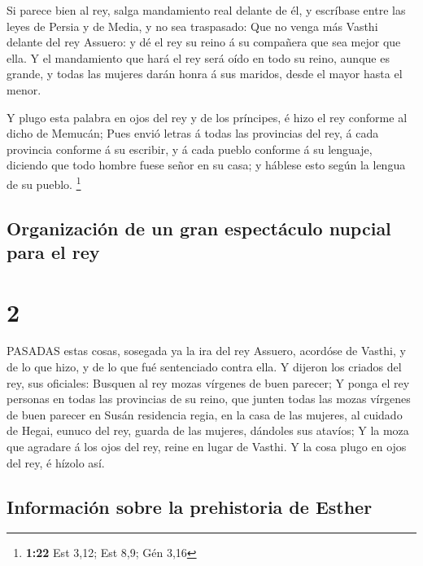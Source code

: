  Si parece bien al rey, salga mandamiento real delante de
él, y escríbase entre las leyes de Persia y de Media, y no sea
traspasado: Que no venga más Vasthi delante del rey Assuero: y dé el rey
su reino á su compañera que sea mejor que ella.  Y el
mandamiento que hará el rey será oído en todo su reino, aunque es
grande, y todas las mujeres darán honra á sus maridos, desde el mayor
hasta el menor.

 Y plugo esta palabra en ojos del rey y de los príncipes, é
hizo el rey conforme al dicho de Memucán;  Pues envió
letras á todas las provincias del rey, á cada provincia conforme á su
escribir, y á cada pueblo conforme á su lenguaje, diciendo que todo
hombre fuese señor en su casa; y háblese esto según la lengua de su
pueblo. \footnote{\textbf{1:22} Est 3,12; Est 8,9; Gén 3,16}

\hypertarget{organizaciuxf3n-de-un-gran-espectuxe1culo-nupcial-para-el-rey}{%
\subsection{Organización de un gran espectáculo nupcial para el
rey}\label{organizaciuxf3n-de-un-gran-espectuxe1culo-nupcial-para-el-rey}}

\hypertarget{section-1}{%
\section{2}\label{section-1}}

 PASADAS estas cosas, sosegada ya la ira del rey Assuero,
acordóse de Vasthi, y de lo que hizo, y de lo que fué sentenciado contra
ella.  Y dijeron los criados del rey, sus oficiales: Busquen
al rey mozas vírgenes de buen parecer;  Y ponga el rey
personas en todas las provincias de su reino, que junten todas las mozas
vírgenes de buen parecer en Susán residencia regia, en la casa de las
mujeres, al cuidado de Hegai, eunuco del rey, guarda de las mujeres,
dándoles sus atavíos;  Y la moza que agradare á los ojos del
rey, reine en lugar de Vasthi. Y la cosa plugo en ojos del rey, é hízolo
así.

\hypertarget{informaciuxf3n-sobre-la-prehistoria-de-esther}{%
\subsection{Información sobre la prehistoria de
Esther}\label{informaciuxf3n-sobre-la-prehistoria-de-esther}}

